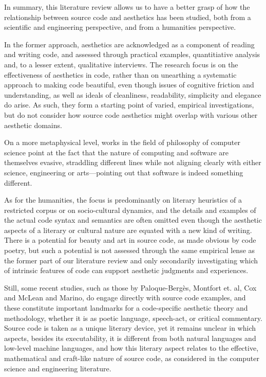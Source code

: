 In summary, this literature review allows us to have a better grasp of how the relationship between source code and aesthetics has been studied, both from a scientific and engineering perspective, and from a humanities perspective.

In the former approach, aesthetics are acknowledged as a component of reading and writing code, and assessed through practical examples, quantitiative analysis and, to a lesser extent, qualitative interviews. The research focus is on the effectiveness of aesthetics in code, rather than on unearthing a systematic approach to making code beautiful, even though issues of cognitive friction and understanding, as well as ideals of cleanliness, readability, simplicity and elegance do arise. As such, they form a starting point of varied, empirical investigations, but do not consider how source code aesthetics might overlap with various other aesthetic domains.

On a more metaphysical level, works in the field of philosophy of computer science point at the fact that the nature of computing and software are themselves evasive, straddling different lines while not aligning clearly with either science, engineering or arts—pointing out that software is indeed something different.

As for the humanities, the focus is predominantly on literary heuristics of a restricted corpus or on socio-cultural dynamics, and the details and examples of the actual code syntax and semantics are often omitted even though the aesthetic aspects of a literary or cultural nature are equated with a new kind of writing. There is a potential for beauty and art in source code, as made obvious by code poetry, but such a potential is not assessed through the same empirical lense as the former part of our literature review and only secondarily investigating which of intrinsic features of code can support aesthetic judgments and experiences.

Still, some recent studies, such as those by Paloque-Bergès, Montfort et. al, Cox and McLean and Marino, do engage directly with source code examples, and these constitute important landmarks for a code-specific aesthetic theory and methodology, whether it is as poetic language, speech-act, or critical commentary. Source code is taken as a unique literary device, yet it remains unclear in which aspects, besides its executability, it is different from both natural languages and low-level machine languages, and how this literary aspect relates to the effective, mathematical and craft-like nature of source code, as considered in the computer science and engineering literature.

